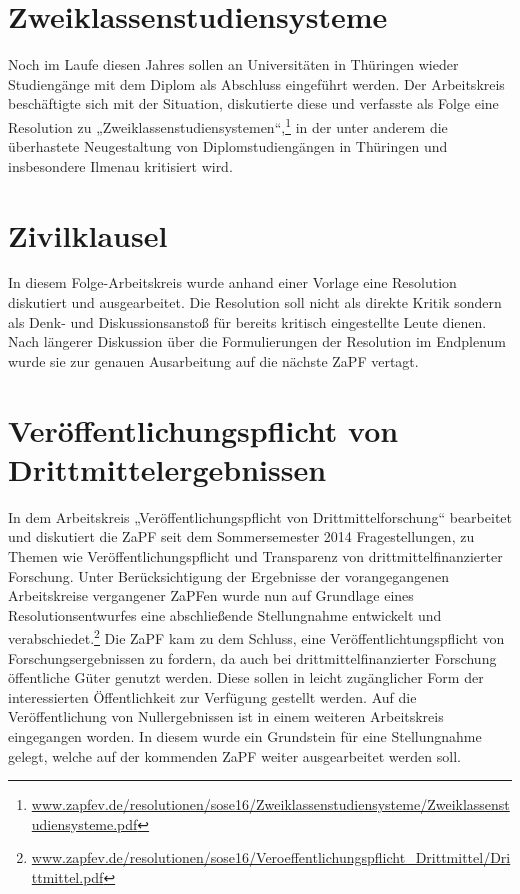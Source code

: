 \section*{Zweiklassenstudiensysteme}
Noch im Laufe diesen Jahres sollen an Universitäten in Thüringen wieder 
Studiengänge mit dem Diplom als Abschluss eingeführt werden. Der Arbeitskreis 
beschäftigte sich mit der Situation, diskutierte diese und verfasste als Folge 
eine Resolution zu 
„Zweiklassenstudiensystemen“,\footnote{\href{http://www.zapfev.de/resolutionen/sose16/Zweiklassenstudiensysteme/Zweiklassenstudiensysteme.pdf}{\url{www.zapfev.de/resolutionen/sose16/Zweiklassenstudiensysteme/Zweiklassenstudiensysteme.pdf}}}
 in der unter anderem die überhastete Neugestaltung von Diplomstudiengängen in 
Thüringen und insbesondere Ilmenau kritisiert wird.

\section*{Zivilklausel}
In diesem Folge-Arbeitskreis wurde anhand einer Vorlage eine Resolution 
diskutiert und ausgearbeitet. Die Resolution soll nicht als direkte Kritik 
sondern als Denk- und Diskussionsanstoß für bereits kritisch eingestellte Leute 
dienen. Nach längerer Diskussion über die Formulierungen der Resolution im 
Endplenum wurde sie zur genauen Ausarbeitung auf die nächste ZaPF vertagt.

\section*{Veröffentlichungspflicht von Drittmittelergebnissen}
In dem Arbeitskreis „Veröffentlichungspflicht von Drittmittelforschung“ 
bearbeitet und diskutiert die ZaPF seit dem Sommersemester 2014 
Fragestellungen, zu Themen wie Veröffentlichungspflicht und Transparenz von 
drittmittelfinanzierter Forschung. Unter Berücksichtigung der Ergebnisse der 
vorangegangenen Arbeitskreise vergangener ZaPFen wurde nun auf Grundlage eines 
Resolutionsentwurfes eine abschließende Stellungnahme entwickelt und 
verabschiedet.\footnote{\href{http://www.zapfev.de/resolutionen/sose16/Veroeffentlichungspflicht_Drittmittel/Drittmittel.pdf}{\url{www.zapfev.de/resolutionen/sose16/Veroeffentlichungspflicht_Drittmittel/Drittmittel.pdf}}}
Die ZaPF kam zu dem Schluss, eine Veröffentlichtungspflicht von 
Forschungsergebnissen zu fordern, da auch bei drittmittelfinanzierter Forschung 
öffentliche Güter genutzt werden. Diese sollen in leicht zugänglicher Form der 
interessierten Öffentlichkeit zur Verfügung gestellt werden. Auf die 
Veröffentlichung von Nullergebnissen ist in einem weiteren Arbeitskreis 
eingegangen worden. In diesem wurde ein Grundstein für eine Stellungnahme 
gelegt, welche auf der kommenden ZaPF weiter ausgearbeitet werden soll.



